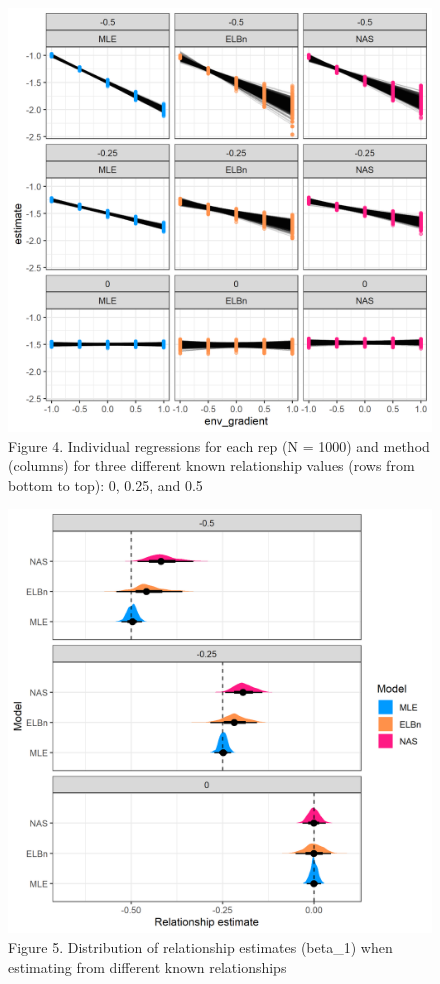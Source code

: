 \documentclass[
]{article}
\begin{document}
\begin{figure}
\centering
\includegraphics{figures/vary_beta_plot.png}
\caption{Figure 4. Individual regressions for each rep (N = 1000) and
method (columns) for three different known relationship values (rows
from bottom to top): 0, 0.25, and 0.5}
\end{figure}

\begin{figure}
\centering
\includegraphics{figures/vary_beta_density_plot.png}
\caption{Figure 5. Distribution of relationship estimates (beta\_1) when
estimating from different known relationships}
\end{figure}
\end{document}
